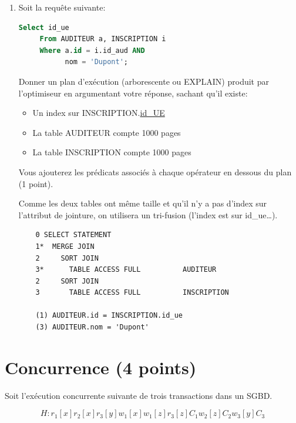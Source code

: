 \begin{enumerate}
  \item Soit la requ\^ete suivante:
      \begin{lstlisting}[language=SQL]
     Select id_ue
     From AUDITEUR a, INSCRIPTION i
     Where a.id = i.id_aud AND
           nom = 'Dupont';
     \end{lstlisting}
     Donner un plan d'ex\'ecution (arborescente ou EXPLAIN) produit par l'optimiseur 
     en argumentant votre r\'eponse, sachant qu'il existe:
     \begin{itemize}
       \item Un index sur INSCRIPTION.\underline{id\_UE}
       \item La table AUDITEUR compte 1000 pages 
       \item La table INSCRIPTION compte 1000 pages
     \end{itemize}
     Vous ajouterez les pr\'edicats associ\'es \`a chaque op\'erateur en dessous du
     plan (1 point).
\begin{correction}
     Comme les deux tables ont m\^eme taille et qu'il n'y a pas d'index sur l'attribut de jointure, on utilisera un tri-fusion (l'index est sur id\_ue\ldots).
    \begin{verbatim}
    0 SELECT STATEMENT
    1*  MERGE JOIN
    2     SORT JOIN
    3*      TABLE ACCESS FULL          AUDITEUR
    2     SORT JOIN
    3       TABLE ACCESS FULL          INSCRIPTION
 
    (1) AUDITEUR.id = INSCRIPTION.id_ue
    (3) AUDITEUR.nom = 'Dupont'
    \end{verbatim}
\end{correction}

\end{enumerate}	

\section{Concurrence (4 points)}

Soit l'ex\'ecution concurrente suivante de trois transactions dans un SGBD.

$$
H: r_1[x] r_2[x] r_3[y] w_1[x] w_1[z] r_3[z] C_1 w_2[z] C_2 w_3[y] C_3
$$

